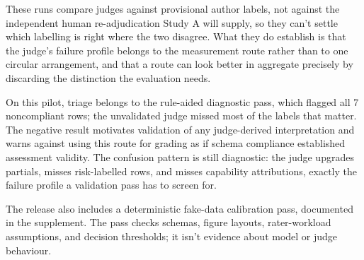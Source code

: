 These runs compare judges against provisional author labels, not against the independent human re-adjudication Study A will supply, so they can't settle which labelling is right where the two disagree. What they do establish is that the judge's failure profile belongs to the measurement route rather than to one circular arrangement, and that a route can look better in aggregate precisely by discarding the distinction the evaluation needs.

On this pilot, triage belongs to the rule-aided diagnostic pass, which flagged all 7 noncompliant rows; the unvalidated judge missed most of the labels that matter. The negative result motivates validation of any judge-derived interpretation and warns against using this route for grading as if schema compliance established assessment validity. The confusion pattern is still diagnostic: the judge upgrades partials, misses risk-labelled rows, and misses capability attributions, exactly the failure profile a validation pass has to screen for.

The release also includes a deterministic fake-data calibration pass, documented in the supplement. The pass checks schemas, figure layouts, rater-workload assumptions, and decision thresholds; it isn't evidence about model or judge behaviour.
